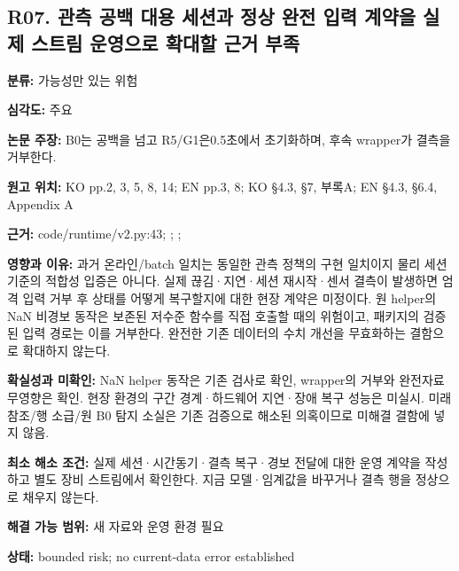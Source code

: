 \documentclass[11pt,a4paper]{article}
\begin{document}
\subsection*{R07. 관측 공백 대용 세션과 정상 완전 입력 계약을 실제 스트림 운영으로 확대할 근거 부족}
\textbf{분류:} 가능성만 있는 위험
\par
\textbf{심각도:} 주요
\par
\textbf{논문 주장:} B0는 공백을 넘고 R5/G1은0.5초에서 초기화하며, 후속 wrapper가 결측을 거부한다.
\par
\textbf{원고 위치:} KO pp.2, 3, 5, 8, 14; EN pp.3, 8; KO §4.3, §7, 부록A; EN §4.3, §6.4, Appendix A
\par
\textbf{근거:} code/runtime/v2.py:43; ; ; 
\par
\textbf{영향과 이유:} 과거 온라인/batch 일치는 동일한 관측 정책의 구현 일치이지 물리 세션 기준의 적합성 입증은 아니다. 실제 끊김·지연·세션 재시작·센서 결측이 발생하면 엄격 입력 거부 후 상태를 어떻게 복구할지에 대한 현장 계약은 미정이다. 원 helper의 NaN 비경보 동작은 보존된 저수준 함수를 직접 호출할 때의 위험이고, 패키지의 검증된 입력 경로는 이를 거부한다. 완전한 기존 데이터의 수치 개선을 무효화하는 결함으로 확대하지 않는다.
\par
\textbf{확실성과 미확인:} NaN helper 동작은 기존 검사로 확인, wrapper의 거부와 완전자료 무영향은 확인. 현장 환경의 구간 경계·하드웨어 지연·장애 복구 성능은 미실시. 미래 참조/행 소급/원 B0 탐지 소실은 기존 검증으로 해소된 의혹이므로 미해결 결함에 넣지 않음.
\par
\textbf{최소 해소 조건:} 실제 세션·시간동기·결측 복구·경보 전달에 대한 운영 계약을 작성하고 별도 장비 스트림에서 확인한다. 지금 모델·임계값을 바꾸거나 결측 행을 정상으로 채우지 않는다.
\par
\textbf{해결 가능 범위:} 새 자료와 운영 환경 필요
\par
\textbf{상태:} bounded risk; no current-data error established
\par
\end{document}
